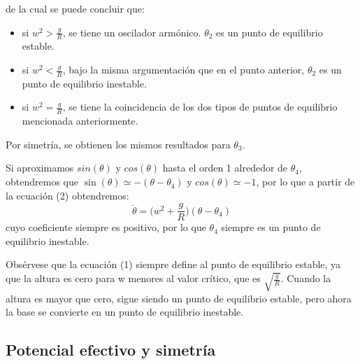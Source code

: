 \documentclass[12p]{article}
\begin{document}
de la cual se puede concluir que:
\begin{itemize}
\item si $w^2 > \frac{g}{R}$, se tiene un oscilador armónico. $\theta_{2}$ es un punto de equilibrio estable.
\item si $w^2 < \frac{g}{R}$, bajo la misma argumentación que en el punto anterior, $\theta_{2}$ es un punto de equilibrio inestable.
\item si $w^2 = \frac{g}{R}$, se tiene la coincidencia de los dos tipos de puntos de equilibrio mencionada anteriormente.
\end{itemize}
Por simetría, se obtienen los mismos resultados para $\theta_{3}$.

Si aproximamos $sin(\theta)$ y $cos(\theta)$ hasta el orden 1 alrededor de $\theta_{4}$, obtendremos que $\sin(\theta)\simeq -(\theta-\theta_{4})$ y $cos(\theta) \simeq -1$, por lo que a partir de la ecuación (2) obtendremos:
\begin{equation}
\ddot{\theta}=\Big(w^2+\frac{g}{R}\Big)(\theta-\theta_{4})
\end{equation}
cuyo coeficiente siempre es positivo, por lo que $\theta_{4}$ siempre es un punto de equilibrio inestable.

Obsérvese que la ecuación (1) siempre define al punto de equilibrio estable, ya que la altura es cero para w menores al valor crítico, que es $\sqrt{\frac{g}{R}}$. Cuando la altura es mayor que cero, sigue siendo un punto de equilibrio estable, pero ahora la base se convierte en un punto de equilibrio inestable.

\subsection{Potencial efectivo y simetría}
\end{document}
